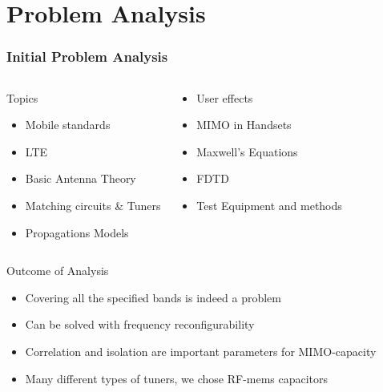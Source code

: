 \section{Problem Analysis}
\begin{frame}[fragile]
    \frametitle{Initial Problem Analysis}
    \vspace*{-0.5cm}
    \begin{columns}[onlytextwidth,t]
    \begin{block}{Topics}
          \begin{itemize}
          \item Mobile standards
          \item LTE
          \item Basic Antenna Theory
          \item Matching circuits \& Tuners
          \item Propagations Models
          \end{itemize}
    \end{block}
    \begin{block}{}
          \begin{itemize}
          \item User effects
          \item MIMO in Handsets
          \item Maxwell's Equations
          \item FDTD 
          \item Test Equipment and methods
          \end{itemize}
    \end{block}
    \end{columns}
    \begin{block}{Outcome of Analysis}
      \begin{itemize}
      \item Covering all the specified bands is indeed a problem
      \item Can be solved with frequency reconfigurability
      \item Correlation and isolation are important parameters for MIMO-capacity
      \item Many different types of tuners, we chose RF-mems capacitors
      \end{itemize}
    \end{block}
\end{frame}

